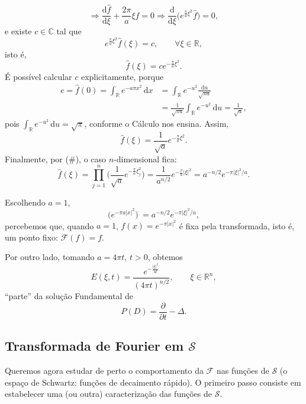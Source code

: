 \documentclass[../distribution_theory_notes.tex]{subfiles}
\begin{document}
\begin{example}
\[		\Rightarrow \frac{\mathrm{d}\hat{f}}{\mathrm{d}\xi }+\frac{2\pi }{a}\xi \hat{f}=0
		\Rightarrow \frac{\mathrm{d}}{\mathrm{d}\xi }\bigl(e^{\frac{\pi }{a}\xi ^{2}}\hat{f}\bigr)=0,
	\]
	e existe \(c\in \mathbb{C}\) tal que
	\[
		e^{\frac{\pi }{a}\xi ^{2}}\hat{f}(\xi )=c,\qquad \forall \xi \in \mathbb{R},
	\]
	isto é,
	\[
		\hat{f}(\xi )=ce^{-\frac{\pi }{a}\xi ^{2}}.
	\]
	É possível calcular \(c\) explicitamente, porque
	\begin{align*}
		c=\hat{f}(0)=\int_{\mathbb{R}}e^{-a\pi x^{2}}\,\mathrm{d}x
		 & =\int_{\mathbb{R}}e^{-u^{2}}\frac{\mathrm{d}u}{\sqrt{\pi a}}    \\
		 & =\frac{1}{\sqrt{\pi a}}\int_{\mathbb{R}}e^{-u^{2}}\,\mathrm{d}u
		=\frac{1}{\sqrt{a}},
	\end{align*}
	pois \(\int_{\mathbb{R}}e^{-u^{2}}\,\mathrm{d}u=\sqrt{\pi}\), conforme o Cálculo nos ensina. Assim,
	\[
		\hat{f}(\xi )=\frac{1}{\sqrt{a}}e^{-\frac{\pi }{a}\xi ^{2}}.
	\]
	Finalmente, por (\#), o caso \(n\)-dimensional fica:
	\[
		\hat{f}(\xi )=\prod_{j=1}^{n}\biggl(\frac{1}{\sqrt{a}}e^{-\frac{\pi }{a}\xi _{j}^{2}}\biggr)
		=\frac{1}{a^{n/2}}e^{-\frac{\pi }{a}|\xi |^{2}}
		=a^{-n/2}e^{-\pi |\xi |^{2}/a}.
	\]

	\begin{tcolorbox}[
			skin=enhanced,
			title=Observação,
			fonttitle=\bfseries,
			colframe=black,
			colbacktitle=cyan!75!white,
			colback=cyan!15,
			colbacklower=black,
			coltitle=black,
			drop fuzzy shadow,
		]
		Escolhendo \(a=1\),
		\[
			\bigl(e^{-\pi a|x|^{2}}\bigr)^{\widehat{\; }}=a^{-n/2}e^{-\pi |\xi |^{2}/a},
		\]
		percebemos que, quando \(a=1\), \(f(x)=e^{-\pi |x|^{2}}\) é fixa pela transformada, isto é, um ponto fixo: \(\mathcal{F}(f)=f\).

		Por outro lado, tomando \(a=4\pi t\), \(t>0\), obtemos
		\[
			E(\xi ,t)=\frac{e^{-\frac{|\xi |^{2}}{4t}}}{(4\pi t)^{n/2}},\qquad \xi \in \mathbb{R}^{n},
		\]
		``parte'' da solução Fundamental de
		\[
			P(D)=\frac{\partial }{\partial t}-\Delta .
		\]

	\end{tcolorbox}
\end{example}

\subsection{Transformada de Fourier em \(\mathcal{S}\)}
Queremos agora estudar de perto o comportamento da \(\mathcal{F}\) nas funções de \(\mathcal{S}\) (o espaço de Schwartz: funções de decaimento rápido). O primeiro passo consiste em estabelecer uma (ou outra) caracterização das funções de \(\mathcal{S}\).
\end{document}
